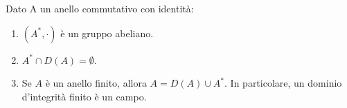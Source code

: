\documentclass[11pt]{scrartcl}
\begin{document}
\begin{soln}
    
\end{soln}

\begin{proposition}
    Dato A un anello commutativo con identità:
    \begin{enumerate}[(1)]
        \item $(A^*,\cdot)$ è un gruppo abeliano.
        \item $A^* \cap D(A) = \emptyset$.
        \item Se $A$ è un anello finito, allora $A = D(A) \cup A^*$. In particolare, un dominio
            d'integrità finito è un campo.
    \end{enumerate}
\end{proposition}
\end{document}
